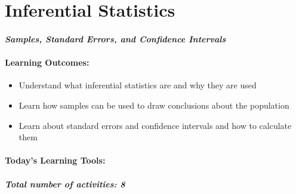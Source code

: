 \documentclass[
]{book}
\providecommand{\tightlist}{%
  \setlength{\itemsep}{0pt}\setlength{\parskip}{0pt}}
\begin{document}
\hypertarget{inferential-statistics}{%
\chapter{Inferential Statistics}\label{inferential-statistics}}

\hypertarget{samples-standard-errors-and-confidence-intervals}{%
\subsubsection*{\texorpdfstring{\emph{Samples, Standard Errors, and Confidence Intervals}}{Samples, Standard Errors, and Confidence Intervals}}\label{samples-standard-errors-and-confidence-intervals}}

\hypertarget{learning-outcomes-4}{%
\subsubsection*{\texorpdfstring{\textbf{Learning Outcomes:}}{Learning Outcomes:}}\label{learning-outcomes-4}}

\begin{itemize}
\tightlist
\item
  Understand what inferential statistics are and why they are used
\item
  Learn how samples can be used to draw conclusions about the population
\item
  Learn about standard errors and confidence intervals and how to calculate them
\end{itemize}

\hypertarget{todays-learning-tools-4}{%
\subsubsection*{\texorpdfstring{\textbf{Today's Learning Tools:}}{Today's Learning Tools:}}\label{todays-learning-tools-4}}

\hypertarget{total-number-of-activities-8-1}{%
\paragraph*{\texorpdfstring{\emph{Total number of activities}: 8}{Total number of activities: 8}}\label{total-number-of-activities-8-1}}
\end{document}
